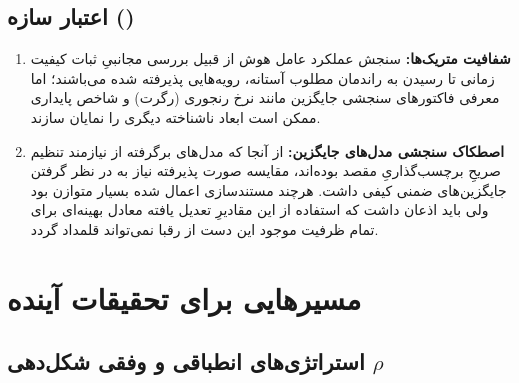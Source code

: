 \documentclass[oneside,openany,phd]{TMU-Thesis}
\begin{document}
\subsection{اعتبار سازه ()}

\begin{enumerate}
    \item \textbf{شفافیت متریک‌ها:} سنجش عملکرد عامل هوش از قبیل بررسی مجانبیِ ثبات کیفیت زمانی تا رسیدن به راندمان مطلوب آستانه، رویه‌هایی پذیرفته شده می‌باشند؛ اما معرفی فاکتورهای سنجشی جایگزین مانند نرخ رنجوری (رگرت) و شاخص پایداری ممکن است ابعاد ناشناخته دیگری را نمایان سازند.
    \item \textbf{اصطکاک سنجشی مدل‌های جایگزین:} از آنجا که مدل‌های برگرفته از  نیازمند تنظیم صریحِ برچسب‌گذاریِ مقصد بوده‌اند، مقایسه صورت پذیرفته نیاز به در نظر گرفتن جایگزین‌های ضمنی کیفی داشت. هرچند مستندسازی اعمال شده بسیار متوازن بود ولی باید اذعان داشت که استفاده از این مقادیرِ تعدیل یافته معادل بهینه‌ای برای تمام ظرفیت موجود این دست از رقبا نمی‌تواند قلمداد گردد.
\end{enumerate}

\section{مسیرهایی برای تحقیقات آینده}

\subsection{استراتژی‌های انطباقی و وفقی شکل‌دهی $\rho$}
\end{document}
